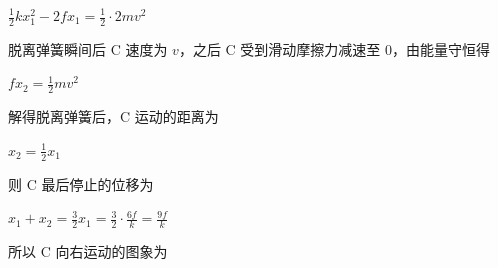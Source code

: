 \documentclass[\gkver]{gaokaozhenti}
\begin{document}
\begin{enumerate}
{$\frac{1}{2}kx_{1}^{2} - 2fx_{1} = \frac{1}{2} \cdot 2mv^{2}$

脱离弹簧瞬间后 C 速度为 $v$，之后 C 受到滑动摩擦力减速至 0，由能量守恒得

$fx_{2} = \frac{1}{2}mv^{2}$

解得脱离弹簧后，C 运动的距离为

$x_{2} = \frac{1}{2}x_{1}$

则 C 最后停止的位移为

$x_{1} + x_{2} = \frac{3}{2}x_{1} = \frac{3}{2} \cdot \frac{6f}{k} = \frac{9f}{k}$

所以 C 向右运动的图象为

}

\end{enumerate}
\end{document}

